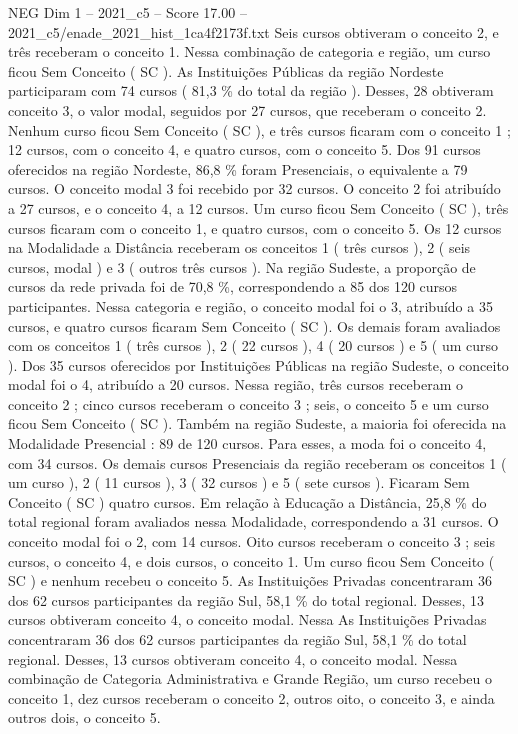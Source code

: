\begin{textsample}{NEG Dim 1 – 2021\_c5 – Score 17.00 – 2021\_c5/enade\_2021\_hist\_1ca4f2173f.txt}
Seis cursos obtiveram o conceito 2, e três receberam o conceito 1.
Nessa combinação de categoria e região, um curso ficou Sem Conceito ( SC ).
As Instituições Públicas da região Nordeste participaram com 74 cursos ( 81,3 \% do total da região ).
Desses, 28 obtiveram conceito 3, o valor modal, seguidos por 27 cursos, que receberam o conceito 2.
Nenhum curso ficou Sem Conceito ( SC ), e três cursos ficaram com o conceito 1 ; 12 cursos, com o conceito 4, e quatro cursos, com o conceito 5.
Dos 91 cursos oferecidos na região Nordeste, 86,8 \% foram Presenciais, o equivalente a 79 cursos.
O conceito modal 3 foi recebido por 32 cursos.
O conceito 2 foi atribuído a 27 cursos, e o conceito 4, a 12 cursos.
Um curso ficou Sem Conceito ( SC ), três cursos ficaram com o conceito 1, e quatro cursos, com o conceito 5.
Os 12 cursos na Modalidade a Distância receberam os conceitos 1 ( três cursos ), 2 ( seis cursos, modal ) e 3 ( outros três cursos ).
Na região Sudeste, a proporção de cursos da rede privada foi de 70,8 \%, correspondendo a 85 dos 120 cursos participantes.
Nessa categoria e região, o conceito modal foi o 3, atribuído a 35 cursos, e quatro cursos ficaram Sem Conceito ( SC ).
Os demais foram avaliados com os conceitos 1 ( três cursos ), 2 ( 22 cursos ), 4 ( 20 cursos ) e 5 ( um curso ).
Dos 35 cursos oferecidos por Instituições Públicas na região Sudeste, o conceito modal foi o 4, atribuído a 20 cursos.
Nessa região, três cursos receberam o conceito 2 ; cinco cursos receberam o conceito 3 ; seis, o conceito 5 e um curso ficou Sem Conceito ( SC ).
Também na região Sudeste, a maioria foi oferecida na Modalidade Presencial : 89 de 120 cursos.
Para esses, a moda foi o conceito 4, com 34 cursos.
Os demais cursos Presenciais da região receberam os conceitos 1 ( um curso ), 2 ( 11 cursos ), 3 ( 32 cursos ) e 5 ( sete cursos ).
Ficaram Sem Conceito ( SC ) quatro cursos.
Em relação à Educação a Distância, 25,8 \% do total regional foram avaliados nessa Modalidade, correspondendo a 31 cursos.
O conceito modal foi o 2, com 14 cursos.
Oito cursos receberam o conceito 3 ; seis cursos, o conceito 4, e dois cursos, o conceito 1.
Um curso ficou Sem Conceito ( SC ) e nenhum recebeu o conceito 5.
As Instituições Privadas concentraram 36 dos 62 cursos participantes da região Sul, 58,1 \% do total regional.
Desses, 13 cursos obtiveram conceito 4, o conceito modal.
Nessa As Instituições Privadas concentraram 36 dos 62 cursos participantes da região Sul, 58,1 \% do total regional.
Desses, 13 cursos obtiveram conceito 4, o conceito modal.
Nessa combinação de Categoria Administrativa e Grande Região, um curso recebeu o conceito 1, dez cursos receberam o conceito 2, outros oito, o conceito 3, e ainda outros dois, o conceito 5.

\end{textsample}
